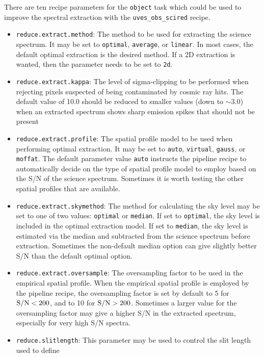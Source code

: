 There are ten recipe parameters for the {\tt object} task which could be used to improve the
spectral extraction with the {\tt uves\_obs\_scired} recipe.
\begin{itemize}
    \item {\tt reduce.extract.method}: The method to be used for extracting the science spectrum.
    It may be set to {\tt optimal}, {\tt average}, or {\tt linear}. In most cases, the default
    optimal extraction is the desired method. If a 2D extraction is wanted, then the parameter needs
    to be set to {\tt 2d}.
    \item {\tt reduce.extract.kappa}: The level of sigma-clipping to be performed when rejecting pixels
    suspected of being contaminated by cosmic ray hits. The default value of 10.0 should be reduced to
    smaller values (down to $\sim3.0$) when an extracted spectrum shows sharp emission spikes that should
    not be present
    \item {\tt reduce.extract.profile}: The spatial profile model to be used when performing optimal
    extraction. It may be set to {\tt auto}, {\tt virtual}, {\tt gauss}, or {\tt moffat}. The
    default parameter value {\tt auto} instructs the pipeline recipe to automatically decide 
    on the type of
    spatial profile model to employ based on the S/N of the science spectrum. Sometimes it is worth
    testing the other spatial profiles that are available.
    \item {\tt reduce.extract.skymethod}: The method for calculating the sky level may be set to one of
    two values: {\tt optimal} or {\tt median}. If set to {\tt optimal}, the sky level is included in the
    optimal extraction model. If set to {\tt median}, the sky level is estimated via the median and
    subtracted from the science spectrum before extraction. Sometimes the non-default median option
    can give slightly better S/N than the default optimal option.
    \item {\tt reduce.extract.oversample}: The oversampling factor to be used in the empirical spatial
    profile. When the empirical spatial profile is employed by the pipeline recipe, the oversampling
    factor is set by default to 5 for ${\rm S}/{\rm N} < 200$, and to 10 for ${\rm S}/{\rm N} > 200$. 
    Sometimes a larger value
    for the oversampling factor may give a higher S/N in the extracted spectrum, 
    especially for very high S/N spectra.
    \item {\tt reduce.slitlength}: This parameter may be used to control the slit length used to define 

\end{itemize}
